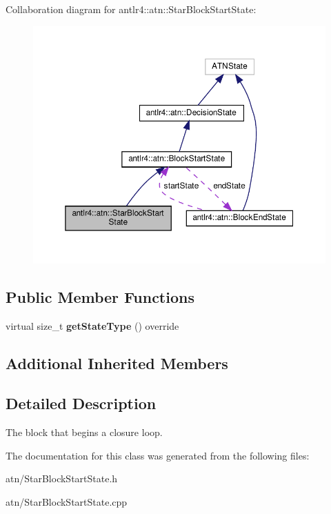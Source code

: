 Collaboration diagram for antlr4\+:\+:atn\+:\+:Star\+Block\+Start\+State\+:
\nopagebreak
\begin{figure}[H]
\begin{center}
\leavevmode
\includegraphics[width=350pt]{classantlr4_1_1atn_1_1StarBlockStartState__coll__graph}
\end{center}
\end{figure}
\subsection*{Public Member Functions}
\begin{DoxyCompactItemize}
\item 
\mbox{\label{classantlr4_1_1atn_1_1StarBlockStartState_a91fa2d45df3dfd5ff5298c4bf23841b2}} 
virtual size\+\_\+t {\bfseries get\+State\+Type} () override
\end{DoxyCompactItemize}
\subsection*{Additional Inherited Members}


\subsection{Detailed Description}
The block that begins a closure loop. 

The documentation for this class was generated from the following files\+:\begin{DoxyCompactItemize}
\item 
atn/Star\+Block\+Start\+State.\+h\item 
atn/Star\+Block\+Start\+State.\+cpp\end{DoxyCompactItemize}
